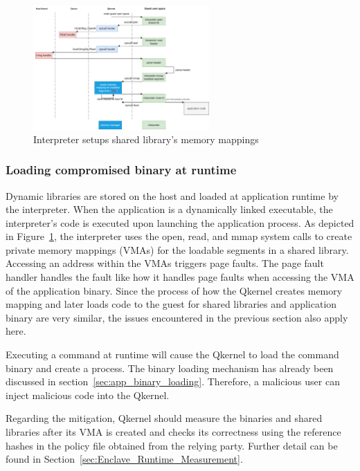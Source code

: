 \begin{figure}[htp]
  \centering
  \includegraphics[width=0.6\textwidth]{images/load_shared_libarart.png}
  \caption[Interpreter setups shared library's memory mappings]{Interpreter setups shared library's memory mappings}
  \label{fig:load_shared_libarart}
\end{figure}


\subsubsection{Loading compromised binary at runtime}
Dynamic libraries are stored on the host and loaded at application runtime by the interpreter. When the application is a dynamically linked executable, the interpreter's code is executed upon launching the application process. As depicted in Figure~\ref{fig:load_shared_libarart}, the interpreter uses the open, read, and mmap 
system calls to create private memory mappings (VMAs) for the loadable segments in a shared library. Accessing an address within the VMAs triggers page faults. The page fault handler handles the fault like how it handles page faults when accessing the VMA of the application binary.
Since the process of how the Qkernel creates memory mapping and later loads code to the guest for shared libraries and application binary are very similar, the issues encountered in the previous section also apply here. 
 
Executing a command at runtime will cause the Qkernel to load the command binary and create a process. The binary loading mechanism has already been discussed in section~\ref{sec:app_binary_loading}. Therefore, a malicious user can inject malicious code into the Qkernel. 
 
Regarding the mitigation, Qkernel should measure the binaries and shared libraries after its VMA is created and checks its correctness using the reference hashes in the policy file obtained from the relying party. Further detail can be found in Section~\ref{sec:Enclave_Runtime_Measurement}. 


